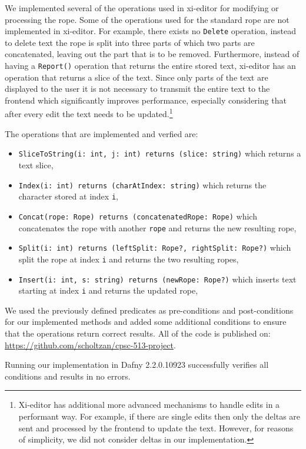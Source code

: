 We implemented several of the operations used in xi-editor for modifying or processing the rope.
Some of the operations used for the standard rope are not implemented in xi-editor. 
For example, there exists no \texttt{Delete} operation, instead to delete text the rope is split into three parts of which two parts are concatenated, leaving out the part that is to be removed.
Furthermore, instead of having a \texttt{Report()} operation that returns the entire stored text, xi-editor has an operation that returns a slice of the text.
Since only parts of the text are displayed to the user it is not necessary to transmit the entire text to the frontend which significantly improves performance, especially considering that after every edit the text needs to be updated.\footnote{Xi-editor has additional more advanced mechanisms to handle edits in a performant way. For example, if there are single edits then only the deltas are sent and processed by the frontend to update the text. However, for reasons of simplicity, we did not consider deltas in our implementation.}

The operations that are implemented and verfied are:
\begin{itemize} 
  \item \texttt{SliceToString(i: int, j: int) returns (slice: string)} which returns a text slice,
  \item \texttt{Index(i: int) returns (charAtIndex: string)} which returns the character stored at index \texttt{i},
  \item \texttt{Concat(rope: Rope) returns (concatenatedRope: Rope)} which concatenates the rope with another \texttt{rope} and returns the new resulting rope,
  \item \texttt{Split(i: int) returns (leftSplit: Rope?, rightSplit: Rope?)} which split the rope at index \texttt{i} and returns the two resulting ropes,
  \item \texttt{Insert(i: int, s: string) returns (newRope: Rope?)} which inserts text starting at index \texttt{i} and returns the updated rope,
\end{itemize}


We used the previously defined predicates as pre-conditions and post-conditions for our implemented methods and added some additional conditions to ensure that the operations return correct results.
All of the code is published on: \url{https://github.com/scholtzan/cpsc-513-project}.

Running our implementation in Dafny 2.2.0.10923 successfully verifies all conditions and results in no errors.


  